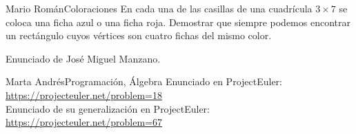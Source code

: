 \documentclass[a4paper, 11pt]{article} %
\numberwithin{prbcounter}{section}
\begin{document}
  \begin{enunciado}{Mario Román}{Coloraciones}
   En cada una de las casillas de una cuadrícula $3 \times 7$ se coloca una ficha azul o una ficha roja.
   Demostrar que siempre podemos encontrar un rectángulo cuyos vértices son cuatro fichas del mismo
   color.
   
   Enunciado de José Miguel Manzano. 
  \end{enunciado}

  \begin{enunciado}{Marta Andrés}{Programación, Álgebra}
   Enunciado en ProjectEuler: \url{https://projecteuler.net/problem=18} \\
   Enunciado de su generalización en ProjectEuler: \url{https://projecteuler.net/problem=67}
  \end{enunciado}

  
\end{document}
